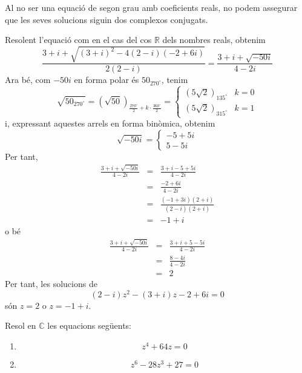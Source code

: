 \begin{solucio}
Al no ser una equació de segon grau amb coeficients reals, no
podem assegurar que les seves solucions siguin dos complexos conjugats.

Resolent l’equació com en el cas del cos $\mathbb{R}$ dels nombres reals, obtenim
\[
\frac{3+i+\sqrt{(3+i)^{2}-4(2-i)(-2+6i)}}{2(2-i)}=\frac{3+i+\sqrt{-50i}}{4-2i
}
\]
Ara bé, com $-50i$ en forma polar és $50_{270
^{\circ}
}$, tenim
\[
\sqrt{50_{270
^{\circ}
}}=\left( \sqrt{50}\right) _{\frac{270
^{\circ}
}{2}+k\cdot \frac{360
^{\circ}
}{2}}=\left\{
\begin{array}{ll}
\left( 5\sqrt{2}\right) _{135
^{\circ}
} & k=0 \\
\left( 5\sqrt{2}\right) _{315
^{\circ}
} & k=1
\end{array}
\right.
\]
i, expressant aquestes arrels en forma binòmica, obtenim
\[
\sqrt{-50i}=\left\{
\begin{array}{l}
-5+5i \\
5-5i
\end{array}
\right.
\]
Per tant,
\begin{eqnarray*}
\frac{3+i+\sqrt{-50i}}{4-2i} &=&\frac{3+i-5+5i}{4-2i} \\
&=&\frac{-2+6i}{4-2i} \\
&=&\frac{(-1+3i)(2+i)}{(2-i)(2+i)} \\
&=&-1+i
\end{eqnarray*}
o bé
\begin{eqnarray*}
\frac{3+i+\sqrt{-50i}}{4-2i} &=&\frac{3+i+5-5i}{4-2i} \\
&=&\frac{8-4i}{4-2i} \\
&=&2
\end{eqnarray*}
Per tant, les solucions de
\[
(2-i)z^{2}-(3+i)z-2+6i=0
\]
són $z=2$ o $z=-1+i$.
\end{solucio}

\begin{exercici}
Resol en $\mathbb{C}$ les equacions següents:

\begin{enumerate}
\item[a)]
\[
z^{4}+64z=0
\]

\item[b)]
\[
z^{6}-28z^{3}+27=0
\]
\end{enumerate}
\end{exercici}

